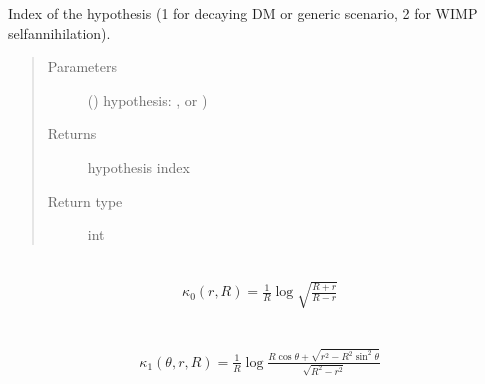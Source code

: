 \documentclass[letterpaper,10pt,english]{sphinxmanual}
\begin{document}
\begin{fulllineitems}
\label{\detokenize{diffsph.utils:diffsph.utils.tools.hypothesis_index}}
\sphinxAtStartPar
Index of the hypothesis (1 for decaying DM or generic scenario, 2 for WIMP self\sphinxhyphen{}annihilation).
\begin{quote}\begin{description}
\item[{Parameters}] \leavevmode
\sphinxAtStartPar
{} () \textendash{} hypothesis: ,  or )

\item[{Returns}] \leavevmode
\sphinxAtStartPar
hypothesis index

\item[{Return type}] \leavevmode
\sphinxAtStartPar
int

\end{description}\end{quote}

\end{fulllineitems}


\begin{fulllineitems}
\label{\detokenize{diffsph.utils:diffsph.utils.tools.ker_0}}~\begin{equation*}
\begin{split}\kappa_0(r,R) = \frac1{R}\log\sqrt{\frac{R+r}{R-r}}\end{split}
\end{equation*}
\end{fulllineitems}


\begin{fulllineitems}
\label{\detokenize{diffsph.utils:diffsph.utils.tools.ker_1}}~\begin{equation*}
\begin{split}\kappa_1(\theta,r,R) = \frac1{R}\log\frac{R\cos\theta+\sqrt{r^2-R^2\sin^2\theta}}{\sqrt{R^2-r^2}}\end{split}
\end{equation*}
\end{fulllineitems}
\end{document}
